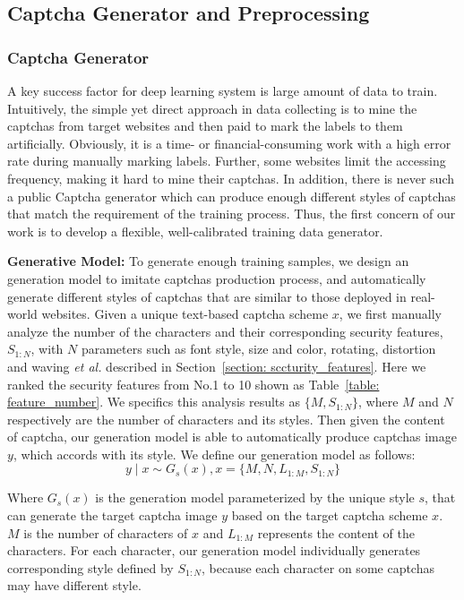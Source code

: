 \subsection{Captcha Generator and Preprocessing} \label{section: Captcha_generator}
\subsubsection{Captcha Generator}
A key success factor for deep learning system is large amount of data to train.
Intuitively, the simple yet direct approach in data collecting is to mine the captchas from target websites and then paid to mark the labels to them artificially. Obviously, it is a time- or financial-consuming work with a high error rate during manually marking labels.
Further, some websites limit the accessing frequency, making it hard to mine their captchas.
In addition, there is never such a public Captcha generator which can produce enough different styles of captchas that match the requirement of the training process.
Thus, the first concern of our work is to develop a flexible, well-calibrated training data generator.

\noindent \textbf{Generative Model:} To generate enough training samples, we design an generation model to imitate captchas production process, and automatically generate different styles of captchas that are similar to those deployed in real-world websites.
Given a unique text-based captcha scheme $x$, we first manually analyze the number of the characters and their corresponding security features, $S_{1:N}$, with $N$ parameters such as font style, size and color, rotating, distortion and waving \emph{et al.} described in Section~\ref{section: sccturity_features}.
Here we ranked the security features from No.1 to 10 shown as Table~\ref{table: feature_number}.
We specifics this analysis results as $\{ M, S_{1:N} \}$, where $M$ and $N$ respectively are the number of characters and its styles.
Then given the content of captcha, our generation model is able to automatically produce captchas image $y$, which accords with its style.
We define our generation model as follows:
\begin{equation}\label{equation: generator_model}
  y \mid x \sim G_s(x),    x = \{M, N, L_{1:M}, S_{1:N} \}
\end{equation}

Where $G_s(x)$ is the generation model parameterized by the unique style $s$, that can generate the target captcha image $y$ based on the target captcha scheme $x$. $M$ is the number of characters of $x$ and $L_{1:M}$ represents the content of the characters. For each character, our generation model individually generates corresponding style defined by $S_{1:N}$, because each character on some captchas may have different style.

